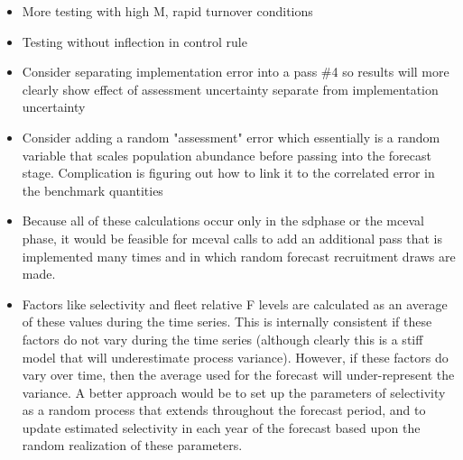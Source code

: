 \begin{itemize}
	\item More testing with high M, rapid turnover conditions
	\item Testing without inflection in control rule
	\item Consider separating implementation error into a pass \#4 so results will more clearly show effect of assessment uncertainty separate from implementation uncertainty
	\item 	Consider adding a random "assessment" error which essentially is a random variable that scales population abundance before passing into the forecast stage.  Complication is figuring out how to link it to the correlated error in the benchmark quantities
	\item Because all of these calculations occur only in the sdphase or the mceval phase, it would be feasible for mceval calls to add an additional pass that is implemented many times and in which random forecast recruitment draws are made.
	\item Factors like selectivity and fleet relative F levels are calculated as an average of these values during the time series.  This is internally consistent if these factors do not vary during the time series (although clearly this is a stiff model that will underestimate process variance).  However, if these factors do vary over time, then the average used for the forecast will under-represent the variance.  A better approach would be to set up the parameters of selectivity as a random process that extends throughout the forecast period, and to update estimated selectivity in each year of the forecast based upon the random realization of these parameters.
\end{itemize}

	
